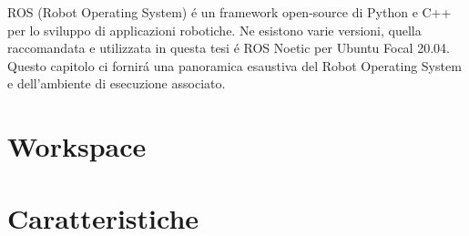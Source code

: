 ROS (Robot Operating System) \'{e} un framework open-source di Python e C++ per lo sviluppo di applicazioni robotiche.
Ne esistono varie versioni, quella raccomandata e utilizzata in questa tesi \'{e} ROS Noetic per Ubuntu Focal 20.04.
Questo capitolo ci fornir\'{a} una panoramica esaustiva del Robot Operating System e dell'ambiente di esecuzione associato.

\section{Workspace}


\section{Caratteristiche}
